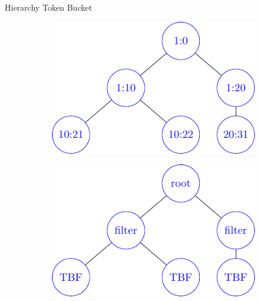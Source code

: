 \documentclass[12pt]{beamer}
\begin{document}
\begin{frame}{Hierarchy Token Bucket}
\begin{figure}
  \begin{subfigure}[b]{0.35\textwidth}
   	\includegraphics[width=\textwidth]{../text/src/pdfimages/class_hierh.pdf}
    \label{fig:f1}
  \end{subfigure}
  \hspace{0.2\textwidth}
  \begin{subfigure}[b]{0.35\textwidth}
   	\includegraphics[width=\textwidth]{../text/src/pdfimages/class_hierh_htb.pdf}
    \label{fig:f2}
  \end{subfigure}
\end{figure}
	\begin{center}

\end{center}
\end{frame}
\end{document}
